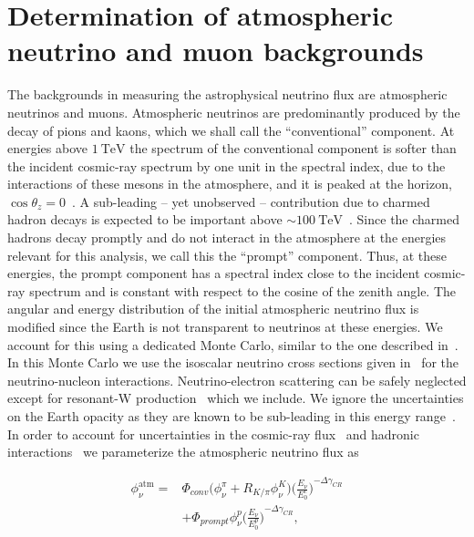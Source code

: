 \chapter{Determination of atmospheric neutrino and muon backgrounds}

The backgrounds in measuring the astrophysical neutrino flux are atmospheric neutrinos and muons.
Atmospheric neutrinos are predominantly produced by the decay of pions and kaons, which we shall call the ``conventional'' component.
At energies above $\SI{1}\TeV$ the spectrum of the conventional component is softer than the incident cosmic-ray spectrum by one unit in the spectral index, due to the interactions of these mesons in the atmosphere, and it is peaked at the horizon, $\cos\theta_z=0$~\cite{Gaisser:2002jj,Barr:2004br,Honda:2006qj,Petrova:2012qf}.
A sub-leading -- yet unobserved -- contribution due to charmed hadron decays is expected to be important above $\sim\SI{100}\TeV$~\cite{Bhattacharya:2015jpa}.
Since the charmed hadrons decay promptly and do not interact in the atmosphere at the energies relevant for this analysis, we call this the ``prompt'' component.
Thus, at these energies, the prompt component has a spectral index close to the incident cosmic-ray spectrum and is constant with respect to the cosine of the zenith angle.
The angular and energy distribution of the initial atmospheric neutrino flux is modified since the Earth is not transparent to neutrinos at these energies.
We account for this using a dedicated Monte Carlo, similar to the one described in~\cite{Gazizov:2004va}.
In this Monte Carlo we use the isoscalar neutrino cross sections given in~\cite{CooperSarkar:2011pa} for the neutrino-nucleon interactions.
Neutrino-electron scattering can be safely neglected except for resonant-W production~\cite{Glashow:1960zz} which we include.
We ignore the uncertainties on the Earth opacity as they are known to be sub-leading in this energy range~\cite{Gandhi:1995tf,CooperSarkar:2011pa,Vincent:2017svp}.
In order to account for uncertainties in the cosmic-ray flux~\cite{Dembinski:2017zsh} and hadronic interactions~\cite{Fedynitch:2012fs} we parameterize the atmospheric neutrino flux as
\noindent
\begin{linenomath*}
	\begin{equation}
	\begin{split}
	\phi_\nu^{\textrm{atm}} =& \Phi_{conv} \bigg(\phi^\pi_\nu + R_{K/\pi} \phi^K_\nu\bigg) {\bigg(\frac{E_\nu}{E_0^c} \bigg)}^{-\Delta \gamma_{CR}} \\ &+ \Phi_{prompt} \phi^p_\nu {\bigg(\frac{E_\nu}{E_0^p} \bigg)}^{-\Delta \gamma_{CR}},
	\end{split}
	\label{eq:atm_flux_equation}
	\end{equation}
\end{linenomath*}
